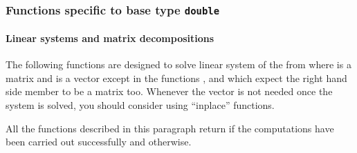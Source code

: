 \subsubsection{Functions specific to base type {\tt double}}


\paragraph{Linear systems and matrix decompositions}

The following functions are designed to solve linear system of the from  where  is a matrix and  is a vector except in the functions
,  and
 which expect the right hand side member to be a
matrix too. Whenever the vector  is not needed once the system is solved,
you should consider using ``inplace'' functions.


All the functions described in this paragraph return  if the
computations have been carried out successfully and  otherwise.

